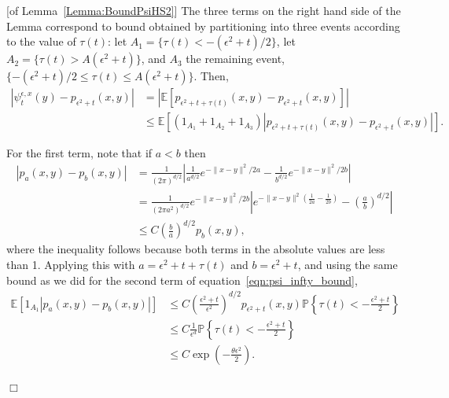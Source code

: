 \documentclass[12pt]{article}
\newenvironment {proof}{{\noindent\bf Proof }}{\hfill $\Box$ \medskip}
\newcommand{\IP}{\mathbb P}
\newcommand{\IE}{\mathbb E}
\begin{document}
\begin{proof}[of Lemma~\ref{Lemma:BoundPsiHS2}]
    The three terms on the right hand side of the Lemma
    correspond to bound obtained by partitioning
    into three events according to the value of $\tau(t)$:
    let $A_1 = \{ \tau(t) < - (\epsilon^2 + t)/2 \}$,
    let $A_2 = \{ \tau(t) > A(\epsilon^2 + t) \}$,
    and $A_3$ the remaining event, $\{ - (\epsilon^2 + t)/2 \le \tau(t) \le A(\epsilon^2 + t) \}$.
    Then,
    \begin{align*}
        \left|
            \psi_t^{\epsilon, x}(y)
            -
            p_{\epsilon^2 + t}(x, y)
        \right|
        &=
        \left|
        \IE\left[
            p_{\epsilon^2 + t + \tau(t)}(x, y)
            -
            p_{\epsilon^2 + t}(x, y)
        \right]
        \right|
        \\&\le
        \IE\left[
            (1_{A_1} + 1_{A_2} + 1_{A_3})
            \left|
            p_{\epsilon^2 + t + \tau(t)}(x, y)
            -
            p_{\epsilon^2 + t}(x, y)
        \right|
        \right] .
    \end{align*}

    For the first term, note that if $a < b$ then
    \begin{align*}
        |p_a(x, y) - p_b(x, y)| 
        &=
        \frac{1}{(2\pi)^{d/2}}
        \left|
            \frac{1}{a^{d/2}}
            e^{-\|x - y\|^2 / 2a}
            -
            \frac{1}{b^{d/2}}
            e^{-\|x - y\|^2 / 2b}
        \right|
        \\ &=
        \frac{1}{(2\pi a^2)^{d/2}}
            e^{-\|x - y\|^2 / 2b}
        \left|
            e^{-\|x - y\|^2 \left(\frac{1}{2a} - \frac{1}{2b}\right)}
            -
            \left(\frac{a}{b}\right)^{d/2}
        \right|
        \\ &\le
        C \left(\frac{b}{a}\right)^{d/2}
        p_b(x, y) ,
    \end{align*}
    where the inequality follows because both terms in the absolute values are less than 1.
    Applying this with $a = \epsilon^2 + t + \tau(t)$ and $b = \epsilon^2 + t$,
    and using the same bound as we did for the second term of equation~\ref{eqn:psi_infty_bound},
    \begin{align*}
        \IE\left[
            1_{A_1} |p_a(x, y) - p_b(x, y)| 
        \right]
        & \le
            C \left(\frac{\epsilon^2 + t}{\epsilon^2}\right)^{d/2}
            p_{\epsilon^2 + t}(x, y) 
            \IP\left\{ \tau(t) < - \frac{\epsilon^2 + t}{2} \right\}
        \\ & \le
            C \frac{1}{\epsilon^d}
            \IP\left\{ \tau(t) < - \frac{\epsilon^2 + t}{2} \right\}
        \\ & \le
        C \exp\left(-\frac{\theta \epsilon^2}{2} \right) .
    \end{align*}


\end{proof}
\end{document}
